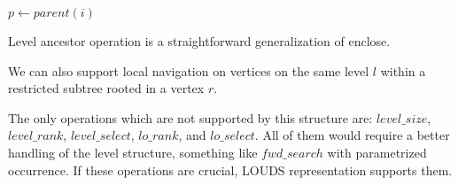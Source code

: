\begin{algorithmic}
	\State {}
\EndFunction
\end{algorithmic}

\begin{algorithmic}
	\State $p \gets parent(i)$
	\State {}
\EndFunction
\end{algorithmic}

\begin{algorithmic}
	\State {}
\EndFunction
\end{algorithmic}

Level ancestor operation is a straightforward generalization of enclose.

\begin{algorithmic}
	\State {}
\EndFunction
\end{algorithmic}

We can also support local navigation on vertices on the same level $l$ within a restricted subtree rooted in a vertex $r$.

\begin{algorithmic}
	\State {}
\EndFunction
\end{algorithmic}

\begin{algorithmic}
	\State {}
\EndFunction
\end{algorithmic}

\begin{algorithmic}
	\State {}
\EndFunction
\end{algorithmic}

\begin{algorithmic}
	\State {}
\EndFunction
\end{algorithmic}

\bigskip

The only operations which are not supported by this structure are: $level\_size$, $level\_rank$, $level\_select$, $lo\_rank$, and $lo\_select$.
All of them would require a better handling of the level structure, something like $fwd\_search$ with parametrized occurrence.
If these operations are crucial, LOUDS representation supports them.


